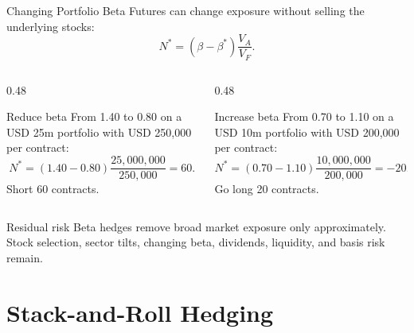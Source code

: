 \documentclass[aspectratio=169,11pt]{beamer}
\begin{document}
\begin{frame}{Changing Portfolio Beta}
    \small
    Futures can change exposure without selling the underlying stocks:
    \[
        N^*=(\beta-\beta^*)\frac{V_A}{V_F}.
    \]

    \begin{columns}[T]
        \begin{column}{0.48\textwidth}
            \begin{block}{Reduce beta}
                From 1.40 to 0.80 on a USD 25m portfolio with USD 250,000 per contract:
                \[
                    N^*=(1.40-0.80)\frac{25{,}000{,}000}{250{,}000}=60.
                \]
                Short 60 contracts.
            \end{block}
        \end{column}
        \begin{column}{0.48\textwidth}
            \begin{block}{Increase beta}
                From 0.70 to 1.10 on a USD 10m portfolio with USD 200,000 per contract:
                \[
                    N^*=(0.70-1.10)\frac{10{,}000{,}000}{200{,}000}=-20.
                \]
                Go long 20 contracts.
            \end{block}
        \end{column}
    \end{columns}

    \begin{alertblock}{Residual risk}
        Beta hedges remove broad market exposure only approximately.
        Stock selection, sector tilts, changing beta, dividends, liquidity, and basis risk remain.
    \end{alertblock}
\end{frame}

\section{Stack-and-Roll Hedging}
\end{document}
